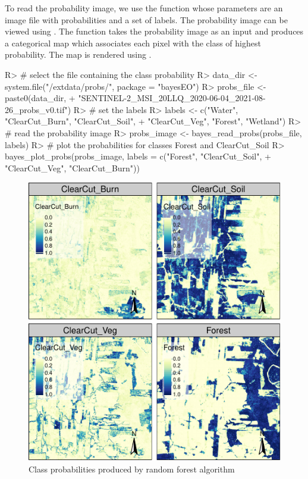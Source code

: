 \documentclass[
  shortnames]{jss}
\begin{document}
To read the probability image, we use the function  whose parameters are an image file with probabilities and a set of labels. The probability image can be viewed using . The function  takes the probability image as an input and produces a categorical map which associates each pixel with the class of highest probability. The map is rendered using .
\newpage

\begin{CodeChunk}
\begin{CodeInput}
R> # select the file containing the class probability
R> data_dir <- system.file("/extdata/probs/", package = "bayesEO")
R> probs_file <- paste0(data_dir, 
+                      "SENTINEL-2_MSI_20LLQ_2020-06-04_2021-08-26_probs_v0.tif")
R> # set the labels
R> labels <- c("Water", "ClearCut_Burn", "ClearCut_Soil",
+             "ClearCut_Veg", "Forest", "Wetland")
R> # read the probability image 
R> probs_image <- bayes_read_probs(probs_file, labels)
R> # plot the probabilities for classes Forest and ClearCut_Soil
R> bayes_plot_probs(probs_image, labels = c("Forest", "ClearCut_Soil", 
+                                          "ClearCut_Veg", "ClearCut_Burn"))
\end{CodeInput}
\begin{figure}[h]

{\centering \includegraphics{Bayesian_smoothing_JSS_files/figure-latex/pcube-1} 

}

\caption[Class probabilities produced by random forest algorithm]{Class probabilities produced by random forest algorithm}\label{fig:pcube}
\end{figure}
\end{CodeChunk}
\end{document}
